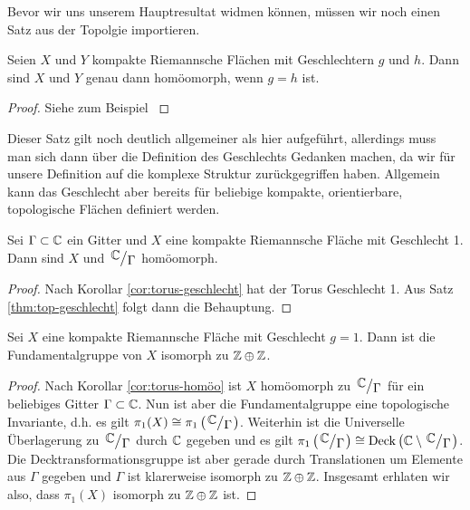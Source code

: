 Bevor wir uns unserem Hauptresultat widmen können, müssen wir noch
einen Satz aus der Topolgie importieren.

\begin{thm}
  \label{thm:top-geschlecht}
  Seien $X$ und $Y$ kompakte Riemannsche Flächen mit Geschlechtern $g$
  und $h$. Dann sind $X$ und $Y$ genau dann homöomorph, wenn $g = h$ ist.
\end{thm}

\begin{proof}
  Siehe zum Beispiel \cite[Korollar 2.4.A.2]{Jos}
\end{proof}

\begin{rem}
  Dieser Satz gilt noch deutlich allgemeiner als hier aufgeführt,
  allerdings muss man sich dann über die Definition des Geschlechts
  Gedanken machen, da wir für unsere Definition auf die
  komplexe Struktur zurückgegriffen haben. Allgemein kann das
  Geschlecht aber bereits für beliebige kompakte, orientierbare, topologische
  Flächen definiert werden.
\end{rem}

\begin{cor}
  \label{cor:torus-homöo}
  Sei $\Gamma \subset \mathbb{C}$ ein Gitter und $X$ eine kompakte Riemannsche
  Fläche mit Geschlecht 1. Dann sind $X$ und $\quot{\C}{\Gamma}$ homöomorph.
\end{cor}

\begin{proof}
  Nach Korollar \ref{cor:torus-geschlecht} hat der Torus Geschlecht
  1. Aus Satz \ref{thm:top-geschlecht} folgt dann die Behauptung.
\end{proof}

\begin{thm}
  \label{thm:geschlecht-1-z}
  Sei $X$ eine kompakte Riemannsche Fläche mit Geschlecht $g =
  1$. Dann ist die Fundamentalgruppe von $X$ isomorph zu $\mathbb{Z} \oplus \mathbb{Z}$.
\end{thm}

\begin{proof}
  Nach Korollar \ref{cor:torus-homöo} ist $X$ homöomorph zu
  $\quot{\C}{\Gamma}$ für ein beliebiges Gitter $\Gamma \subset
  \mathbb{C}$. Nun ist aber die Fundamentalgruppe eine topologische
  Invariante, d.h. es gilt $\pi_1(X) \cong
  \pi_1\left(\quot{\C}{\Gamma}\right)$. Weiterhin ist die Universelle
  Überlagerung zu $\quot{\C}{\Gamma}$ durch $\mathbb{C}$ gegeben und es gilt $
  \pi_1\left (\quot{\C}{\Gamma}\right) \cong \Deck \left (\C \setminus
    \quot{\C}{\Gamma} \right )$. Die Decktransformationsgruppe ist
  aber gerade durch Translationen um Elemente aus $\Gamma$ gegeben und
  $\Gamma$ ist klarerweise isomorph zu $\mathbb{Z} \oplus \mathbb{Z}$. Insgesamt
  erhlaten wir also, dass $\pi_1(X)$ isomorph zu $\mathbb{Z} \oplus \mathbb{Z}$ ist.
\end{proof}

